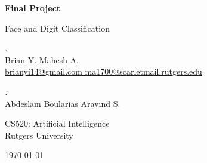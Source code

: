 \documentclass[10pt,parskip=half,
toc=sectionentrywithdots,
bibliography=totocnumbered,
captions=tableheading,numbers=noendperiod]{scrartcl}
\begin{document}
    \begin{titlepage}

  \begin{center}

  \vspace*{1cm}

  \Huge\textbf{Final Project}

  \vspace{0.5cm}\LARGE{Face and Digit Classification}

  \vspace{1.5cm}

  \begin{minipage}{0.8\textwidth}
    \begin{center}
    \begin{minipage}{0.39\textwidth}
    \begin{flushleft} \Large
    \emph{:}\\Brian Y. Mahesh A.\\\href{mailto:brianyi14@gmail.com ma1700@scarletmail.rutgers.edu}{brianyi14@gmail.com ma1700@scarletmail.rutgers.edu}
    \end{flushleft}
    \end{minipage}
    \hspace{\fill}
    \begin{minipage}{0.39\textwidth}
    \begin{flushright} \Large\emph{:} \\
        Abdeslam Boularias
        Aravind S.
    \end{flushright}
    \end{minipage}
    \end{center}
  \end{minipage}

  \vfill

  \begin{minipage}{0.8\textwidth}
  \begin{center}
  \end{center}
  \end{minipage}

  \vspace{0.8cm}
      \LARGE{CS520: Artificial Intelligence}\\
      \LARGE{Rutgers University}\\

  \vspace{0.4cm}

  \today

  \end{center}
  \end{titlepage}
\end{document}
